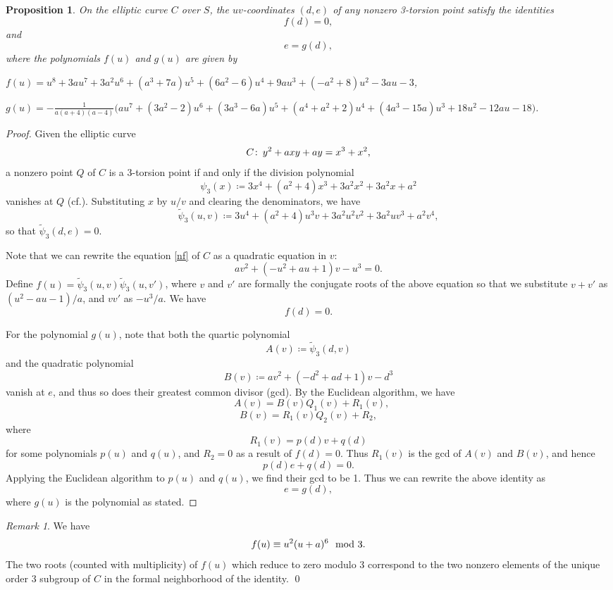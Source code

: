 \documentclass{gtpart}
\newtheorem{prop}[thm]{Proposition}
\theoremstyle{definition}
\theoremstyle{remark}
\newtheorem{rmk}[thm]{Remark}
\def\co{\colon\thinspace}
\newcommand{\cff}[2]{cf.\thinspace{\cite[#1]{#2}}}
\newcommand{\TP}{\widetilde{\psi}}
\newcommand{\md}{~~{\rm mod}~}
\begin{document}
\begin{prop}
\label{prop:tors}
 On the elliptic curve $C$ over $S$, the $uv$-coordinates $(d,e)$ of any nonzero 3-torsion point satisfy the identities 
 \[
  f(d) = 0, 
 \]
 and 
 \[
  e = g(d), 
 \]
 where the polynomials $f(u)$ and $g(u)$ are given by 

 $f(u) = u^8 + 3 a u^7 + 3 a^2 u^6 + (a^3 + 7 a) u^5 + (6 a^2 - 6) u^4 + 9 a u^3 + (-a^2 + 8) u^2 - 3 a u - 3$, 

 $g(u) = -\frac{1}{a (a + 4) (a - 4)} \big(a u^7 + (3 a^2 - 2) u^6 + (3 a^3 - 6 a) u^5 + (a^4 + a^2 + 2) u^4 + (4 a^3 - 15 a) u^3 + 18 u^2 - 12 a u - 18\big)$.  
\end{prop}
\begin{proof}
 Given the elliptic curve 
 \[
  C \co y^2 + a x y + a y = x^3 + x^2, 
 \]
 a nonzero point $Q$ of $C$ is a 3-torsion point if and only if the division polynomial 
 \[
  \psi_3 (x) \coloneqq 3x^4 + (a^2 + 4) x^3 + 3a^2 x^2 + 3a^2 x + a^2 
 \]
 vanishes at $Q$ (\cff{exercise 3.7d}{AEC}).  Substituting $x$ by $u/v$ and clearing the denominators, we have 
 \[
  \TP_3(u,v) \coloneqq 3u^4 + (a^2 + 4) u^3 v + 3a^2 u^2 v^2 + 3a^2 u v^3 + a^2 v^4, 
 \]
 so that $\TP_3(d,e) = 0$.  

 Note that we can rewrite the equation \eqref{nf} of $C$ as a quadratic equation in $v$: 
 \[
  a v^2 + (-u^2 + a u + 1) v - u^3 = 0.  
 \]
 Define $f(u) = \TP_3(u,v) \TP_3(u,v')$, where $v$ and $v'$ are formally the conjugate roots of the 
 above equation so that we substitute $v + v'$ as $(u^2 - a u - 1) / a$, and $v v'$ as $-u^3 / a$.  We have 
 \[
  f(d) = 0.  
 \]

 For the polynomial $g(u)$, note that both the quartic polynomial 
 \[
  A(v) \coloneqq \TP_3(d,v) 
 \]
 and the quadratic polynomial 
 \[
  B(v) \coloneqq a v^2 + (-d^2 + a d + 1) v - d^3
 \]
 vanish at $e$, and thus so does their greatest common divisor (gcd).  By the Euclidean algorithm, we have 
 \[
  ~~~A(v) = B(v)Q_1(v) + R_1(v), 
 \]
 \[
  B(v) = R_1(v)Q_2(v) + R_2, 
 \]
 where 
 \[
  R_1(v) = p(d) v + q(d)
 \]
 for some polynomials $p(u)$ and $q(u)$, and $R_2 = 0$ as a result of $f(d) = 0$.  Thus $R_1(v)$ is the gcd of $A(v)$ and $B(v)$, and hence 
 \[
  p(d) e + q(d) = 0.  
 \]
 Applying the Euclidean algorithm to $p(u)$ and $q(u)$, we find their gcd to be 1.  
 Thus we can rewrite the above identity as 
 \[
  e = g(d), 
 \]
 where $g(u)$ is the polynomial as stated.  
\end{proof}

\begin{rmk}
\label{rmk:dmod3}
 We have 
 \[
  f(u) \equiv u^2 (u + a)^6 \md 3.  
 \]
 The two roots (counted with multiplicity) of $f(u)$ which reduce to zero modulo 3 correspond to 
 the two nonzero elements of the unique order 3 subgroup of $C$ in the formal neighborhood of the identity.  
\qed
\end{rmk}
\end{document}
